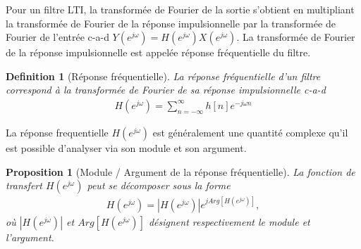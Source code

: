 \documentclass[11pt,a4paper]{IEEEtran}
\newtheorem{proposition}{Proposition}
\newtheorem{definition}{Definition}
\begin{document}
Pour un filtre LTI, la transformée de Fourier de la sortie s'obtient en multipliant la transformée de Fourier de la réponse impulsionnelle par la transformée de Fourier de l'entrée c-a-d $Y(e^{j\omega})=H(e^{j\omega})X(e^{j\omega})$. La transformée de Fourier de la réponse impulsionnelle est appelée réponse fréquentielle du filtre.

\begin{definition}[Réponse fréquentielle]
La réponse fréquentielle d'un filtre correspond à la transformée de Fourier de sa réponse impulsionnelle c-a-d
\begin{align}
H(e^{j\omega})=\sum_{n=-\infty}^{\infty}h[n]e^{-j\omega n}
\end{align}
\end{definition}
La réponse frequentielle $H(e^{j\omega})$ est généralement une quantité complexe qu'il est possible d'analyser via son module et son argument.
\begin{proposition}[Module / Argument de la réponse fréquentielle]
La fonction de transfert $H(e^{j\omega})$ peut se décomposer sous la forme
\begin{align}
H(e^{j\omega})=|H(e^{j\omega})| e^{j Arg[H(e^{j\omega})]},
\end{align} 
où $|H(e^{j\omega})|$ et $Arg[H(e^{j\omega})]$ désignent respectivement le module et l'argument. 
\end{proposition}
\end{document}
